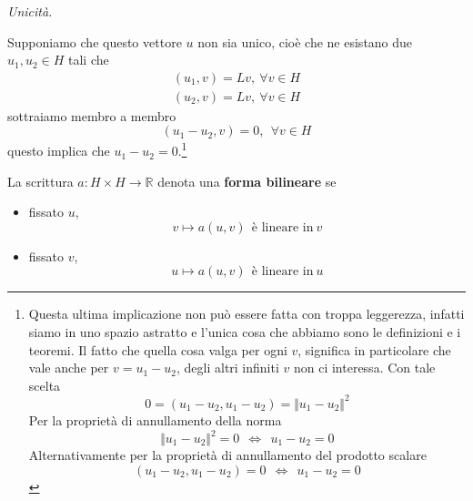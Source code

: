 \documentclass[10pt,a4paper,twoside,openright]{book}
\begin{document}
\begin{dimostrazione}
    \textit{Unicità.}

    Supponiamo che questo vettore $u$ non sia unico, cioè che ne esistano due $u_{1},u_{2} \in H$ tali che
    \begin{gather*}
        (u_{1},v) =Lv,\ \forall v\in H\\
        (u_{2},v) =Lv,\ \forall v\in H
    \end{gather*}
    sottraiamo membro a membro
    \begin{equation*}
        (u_{1} -u_{2},v) =0,\ \ \forall v\in H
    \end{equation*}
    questo implica che $u_{1} -u_{2} =0$.\footnote{Questa ultima implicazione non può essere fatta con troppa leggerezza, infatti siamo in uno spazio astratto e l'unica cosa che abbiamo sono le definizioni e i teoremi. Il fatto che quella cosa valga per ogni $v$, significa in particolare che vale anche per $v=u_{1} -u_{2}$, degli altri infiniti $v$ non ci interessa. Con tale scelta
    \begin{equation*}
        0=(u_{1} -u_{2},u_{1} -u_{2}) =\Vert u_{1} -u_{2}\Vert ^{2}
    \end{equation*}
    Per la proprietà di annullamento della norma
    \begin{equation*}
        \Vert u_{1} -u_{2}\Vert ^{2} =0\ \ \Leftrightarrow \ \ u_{1} -u_{2} =0
    \end{equation*}
    Alternativamente per la proprietà di annullamento del prodotto scalare
    \begin{equation*}
        (u_{1} -u_{2},u_{1} -u_{2}) =0\ \ \Leftrightarrow \ \ u_{1} -u_{2} =0
    \end{equation*}}
\end{dimostrazione}
\begin{definition}
    La scrittura $a:H\times H\rightarrow \mathbb{R}$ denota una \textbf{forma bilineare} se
    \begin{itemize}
        \item fissato $u$,
              \begin{equation*}
                  v\mapsto a(u,v) \ \ \text{è lineare in} \ v
              \end{equation*}
        \item fissato $v$,
              \begin{equation*}
                  u\mapsto a(u,v) \ \ \text{è lineare in} \ u
              \end{equation*}
    \end{itemize}
\end{definition}
\end{document}
